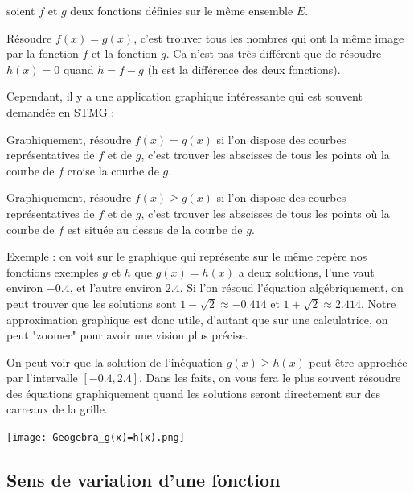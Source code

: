 \documentclass[10pt,a4paper]{book}
\begin{document}
soient $f$ et $g$ deux fonctions définies sur le même ensemble $E$.

Résoudre $f(x)=g(x)$, c'est trouver tous les nombres qui ont la même image par la fonction $f$ et la fonction $g$. Ca n'est pas très différent que de résoudre $h(x)=0$ quand $h=f-g$ (h est la différence des deux fonctions).

Cependant, il y a une application graphique intéressante qui est souvent demandée en STMG : 

\begin{prop}
    Graphiquement, résoudre $f(x)=g(x)$ si l'on dispose des courbes représentatives de $f$ et de $g$, c'est trouver les abscisses de tous les points où la courbe de $f$ croise la courbe de $g$.

    Graphiquement, résoudre $f(x) \geq g(x)$ si l'on dispose des courbes représentatives de $f$ et de $g$, c'est trouver les abscisses de tous les points où la courbe de $f$ est située au dessus de la courbe de $g$.

\end{prop}

\begin{minipage}{0.5\textwidth}

    Exemple : on voit sur le graphique qui représente sur le même repère nos fonctions exemples $g$ et $h$ que $g(x)=h(x)$ a deux solutions, l'une vaut environ $-0.4$, et l'autre environ $2.4$. Si l'on résoud l'équation algébriquement, on peut trouver que les solutions sont $1-\sqrt{2} \approx -0.414$ et $1+\sqrt{2} \approx 2.414$. Notre approximation graphique est donc utile, d'autant que sur une calculatrice, on peut "zoomer" pour avoir une vision plus précise.
    
    On peut voir que la solution de l'inéquation $g(x) \geq h(x)$ peut être approchée par l'intervalle $[-0.4,2.4]$.  Dans les faits, on vous fera le plus souvent résoudre des équations graphiquement quand les solutions seront directement sur des carreaux de la grille.

    \end{minipage}
    \begin{minipage}{0.45\textwidth}
    
        \centering
        \texttt{[image: Geogebra\_g(x)=h(x).png]} 
    \end{minipage}


\subsection{Sens de variation d'une fonction}
\end{document}
